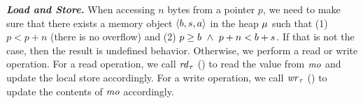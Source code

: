\textbf{\textit{Load and Store.}}
When accessing $n$ bytes from a pointer $p$,
we need to make sure that there exists a memory object $\langle{b},{s},{a}\rangle$ in the heap $\mathit{\mu}$ such that
(1) $p < p + n$ (\ie there is no overflow) and (2) $p \geq \addr \ \land \ p + n < \addr + \size$.
If that is not the case, then the result is undefined behavior.
Otherwise, we perform a read or write operation.
For a read operation,
we call $\mathit{rd}_{\tau}$ () to read the value from $\mathit{mo}$ and update the local store accordingly.
For a write operation,
we call $\mathit{wr}_{\tau}$ () to update the contents of $\mathit{mo}$ accordingly.


